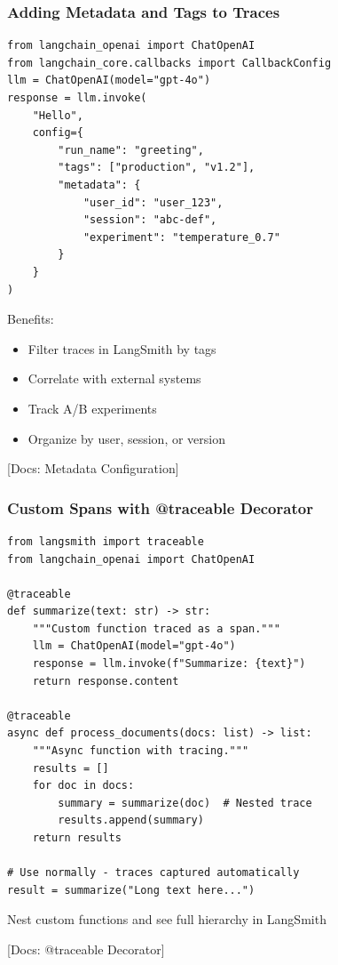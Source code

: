 \documentclass[aspectratio=169,11pt]{beamer}
\newcommand{\docref}[1]{{\scriptsize\color{docgray}[Docs: #1]}}
\begin{document}
\begin{frame}[fragile]
  \frametitle{Adding Metadata and Tags to Traces}

  \begin{lstlisting}
from langchain_openai import ChatOpenAI
from langchain_core.callbacks import CallbackConfig
llm = ChatOpenAI(model="gpt-4o")
response = llm.invoke(
    "Hello",
    config={
        "run_name": "greeting",
        "tags": ["production", "v1.2"],
        "metadata": {
            "user_id": "user_123",
            "session": "abc-def",
            "experiment": "temperature_0.7"
        }
    }
)
  \end{lstlisting}

  \vspace{0.1cm}

  Benefits:
  \begin{itemize}
    \setlength{\itemsep}{1pt}
    \item Filter traces in LangSmith by tags
    \item Correlate with external systems
    \item Track A/B experiments
    \item Organize by user, session, or version
  \end{itemize}

  \docref{Metadata Configuration}
\end{frame}


\begin{frame}[fragile]
  \frametitle{Custom Spans with @traceable Decorator}

  \begin{lstlisting}
from langsmith import traceable
from langchain_openai import ChatOpenAI

@traceable
def summarize(text: str) -> str:
    """Custom function traced as a span."""
    llm = ChatOpenAI(model="gpt-4o")
    response = llm.invoke(f"Summarize: {text}")
    return response.content

@traceable
async def process_documents(docs: list) -> list:
    """Async function with tracing."""
    results = []
    for doc in docs:
        summary = summarize(doc)  # Nested trace
        results.append(summary)
    return results

# Use normally - traces captured automatically
result = summarize("Long text here...")
  \end{lstlisting}

  \vspace{0.1cm}

  \begin{tipbox}[Benefit]
    Nest custom functions and see full hierarchy in LangSmith
  \end{tipbox}

  \docref{@traceable Decorator}
\end{frame}
\end{document}
